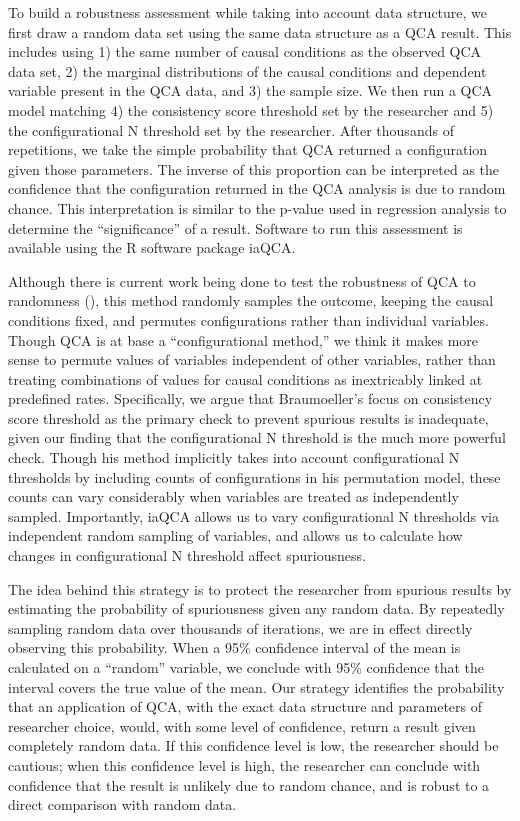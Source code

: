 \documentclass[]{article}
\begin{document}
{To build a robustness assessment while taking into account data structure, we first draw a random data set using the same data structure as a QCA result. This includes using 1) the same number of causal conditions as the observed QCA data set, 2) the marginal distributions of the causal conditions and dependent variable present in the QCA data, and 3) the sample size. We then run a QCA model matching 4) the consistency score threshold set by the researcher and 5) the configurational N threshold set by the researcher. After thousands of repetitions, we take the simple probability that QCA returned a configuration given those parameters. The inverse of this proportion can be interpreted as the confidence that the configuration returned in the QCA analysis is due to random chance. This interpretation is similar to the p-value used in regression analysis to determine the ``significance'' of a result. Software to run this assessment is available using the R software package iaQCA. 

Although there is current work being done to test the robustness of QCA to randomness (\citealt{braumoeller_2015,braumoeller_2015data}), this method randomly samples the outcome, keeping the causal conditions fixed, and permutes configurations rather than individual variables. Though QCA is at base a ``configurational method,'' we think it makes more sense to permute values of variables independent of other variables, rather than treating combinations of values for causal conditions as inextricably linked at predefined rates. Specifically, we argue that Braumoeller's focus on consistency score threshold as the primary check to prevent spurious results is inadequate, given our finding that the configurational N threshold is the much more powerful check. Though his method implicitly takes into account configurational N thresholds by including counts of configurations in his permutation model, these counts can vary considerably when variables are treated as independently sampled. Importantly, iaQCA allows us to vary configurational N thresholds via independent random sampling of variables, and allows us to calculate how changes in configurational N threshold affect spuriousness. 

The idea behind this strategy is to protect the researcher from spurious results by estimating the probability of spuriousness given any random data. By repeatedly sampling random data over thousands of iterations, we are in effect directly observing this probability. When a 95\% confidence interval of the mean is calculated on a ``random'' variable, we conclude with 95\% confidence that the interval covers the true value of the mean. Our strategy identifies the probability that an application of QCA, with the exact data structure and parameters of researcher choice, would, with some level of confidence, return a result given completely random data. If this confidence level is low, the researcher should be cautious; when this confidence level is high, the researcher can conclude with confidence that the result is unlikely due to random chance, and is robust to a direct comparison with random data. 



}
\end{document}
